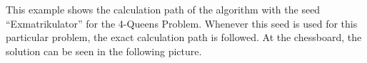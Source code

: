 This example shows the calculation path of the algorithm with the seed \enquote{Exmatrikulator} for the 4-Queens Problem. Whenever this seed is used for this particular problem, the exact calculation path is followed. At the chessboard, the solution can be seen in the following picture.

